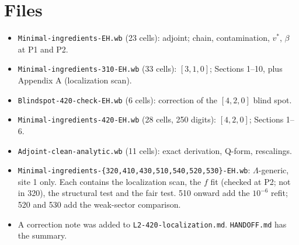 \documentclass[11pt]{article}
\begin{document}
\section{Files}\label{sec:files}
\begin{itemize}
\item \texttt{Minimal-ingredients-EH.wb} (23 cells): adjoint; chain, contamination, $v^*$, $\beta$ at P1 and P2.
\item \texttt{Minimal-ingredients-310-EH.wb} (33 cells): $[3,1,0]$; Sections 1--10, plus Appendix A (localization scan).
\item \texttt{Blindspot-420-check-EH.wb} (6 cells): correction of the $[4,2,0]$ blind spot.
\item \texttt{Minimal-ingredients-420-EH.wb} (28 cells, 250 digits): $[4,2,0]$; Sections 1--6.
\item \texttt{Adjoint-clean-analytic.wb} (11 cells): exact derivation, Q-form, rescalings.
\item \texttt{Minimal-ingredients-\{320,410,430,510,540,520,530\}-EH.wb}: $\Lambda$-generic, site 1 only. Each contains the localization scan, the $f$ fit (checked at P2; not in 320), the structural test and the fair test. 510 onward add the $10^{-6}$ refit; 520 and 530 add the weak-sector comparison.
\item A correction note was added to \texttt{L2-420-localization.md}. \texttt{HANDOFF.md} has the summary.
\end{itemize}
\end{document}
